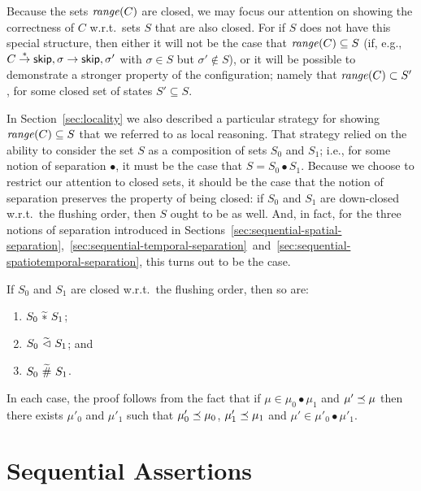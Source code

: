 \documentclass[11pt]{report}         %
\begin{document}
Because the sets $\mathit{range}(C)$ are closed, we may focus our attention on showing the correctness of $C$ w.r.t.\ sets $S$ that are also closed. For if $S$ does not have this special structure, then either it will not be the case that $\mathit{range}(C) \subseteq S$ (if, e.g., $C \stackrel{\ast}{\rightarrow} \operatorname{\mathsf{skip}},\sigma \rightarrow \operatorname{\mathsf{skip}},\sigma'$ with $\sigma \in S$ but $\sigma' \notin S$), or it will be possible to demonstrate a stronger property of the configuration; namely that $\mathit{range}(C) \subset S'$, for some closed set of states $S' \subseteq S$. 

In Section~\ref{sec:locality} we also described a particular strategy for showing $\mathit{range}(C) \subseteq S$ that we referred to as local reasoning. That strategy relied on the ability to consider the set $S$ as a composition of sets $S_0$ and $S_1$; i.e., for some notion of separation $\bullet$, it must be the case that $S = S_0 \bullet S_1$. Because we choose to restrict our attention to closed sets, it should be the case that the notion of separation preserves the property of being closed: if $S_0$ and $S_1$ are down-closed w.r.t.\ the flushing order, then $S$ ought to be as well. And, in fact, for the three notions of separation introduced in Sections~\ref{sec:sequential-spatial-separation},~\ref{sec:sequential-temporal-separation}~and~\ref{sec:sequential-spatiotemporal-separation}, this turns out to be the case. 
\begin{proposition}
    \label{lem:separation-preserves-closure}    
    If $S_0$ and $S_1$ are closed w.r.t.\ the flushing order, then so are: 
    \begin{enumerate}
        \item $S_0 \operatorname{\,\widetilde{\ast}\,} S_1$; 
        \item $S_0 \operatorname{\,\widetilde{\vartriangleleft}\,} S_1$; and 
        \item $S_0 \operatorname{\,\widetilde{\#}\,} S_1$.
    \end{enumerate}
\end{proposition}

In each case, the proof follows from the fact that if $\mu \in \mu_0 \bullet \mu_1$ and $\mu' \preceq \mu$ then there exists $\mu'_0$ and $\mu'_1$ such that $\mu'_0 \preceq \mu_0$, $\mu'_1 \preceq \mu_1$ and $\mu' \in \mu'_0 \bullet \mu'_1$. 

\section{Sequential Assertions}
\label{sec:uniprocessor-assertions}
\end{document}
